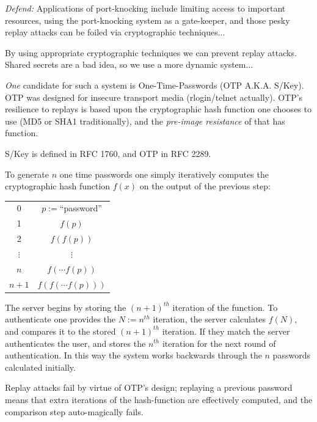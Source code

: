 \documentclass[landscape,twocolumn]{foils}
\begin{document}
\emph{Defend:} Applications of port-knocking include limiting access to important resources, using the port-knocking system as a gate-keeper, and those pesky replay attacks can be foiled via cryptographic techniques...

\normalsize
By using appropriate cryptographic techniques we can prevent replay attacks.  Shared secrets are a bad idea, so we use a more dynamic system...

\emph{One} candidate for such a system is One-Time-Passwords (OTP A.K.A. S/Key).  OTP was designed for insecure transport media (rlogin/telnet actually).  OTP's resilience to replays is based  upon the cryptographic hash function one chooses to use (MD5 or SHA1 traditionally), and the \emph{pre-image resistance} of that has function.

S/Key is defined in RFC 1760, and OTP in RFC 2289.

\small
To generate $n$ one time passwords one simply iteratively computes the cryptographic hash function $f(x)$ on the output of the previous step:

\begin{table}
\begin{center}
\begin{tabular}{|c|c|}
\hline
0 & $p:=$``password'' \\
1 & $f(p)$ \\
2 & $f(f(p))$ \\
$\vdots$ & $\vdots$ \\
$n$ & $f(\cdots f(p))$ \\
$n+1$ &  $f(f(\cdots f(p)))$ \\
\hline
\end{tabular}
\end{center}
\label{default}
\end{table}

The server begins by storing the $(n\!+\!1)^{th}$ iteration of the function.  To authenticate one provides the $N:=\!n^{th}$ iteration, the server calculates $f(N)$, and compares it to the stored $(n\!+\!1)^{th}$ iteration.  If they match the server authenticates the user, and stores the $n^{th}$ iteration for the next round of authentication.  In this way the system works backwards through the $n$ passwords calculated initially.

\normalsize
Replay attacks fail by virtue of OTP's design; replaying a previous password means that extra iterations of the hash-function are effectively computed, and the comparison step auto-magically fails.
\end{document}
